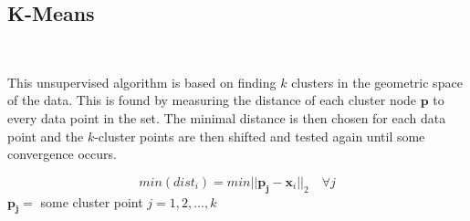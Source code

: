 \documentclass{article}
\begin{document}
		\subsection{K-Means}~
				
			This unsupervised algorithm is based on finding $ k $ clusters in the geometric space of the data. This is found by measuring the distance of each cluster node $ \mathbf{p} $ to every data point in the set. The minimal distance is then chosen for each data point and the $ k $-cluster points are then shifted and tested again until some convergence occurs.
			
			\begin{equation}
				min (dist_{i})	 = min || \mathbf{p_j} - \mathbf{x}_i ||_2\quad \forall j
			\end{equation}
			$ \mathbf{p_j} =$ some cluster point $ j = 1,2,...,k $\\
\end{document}
